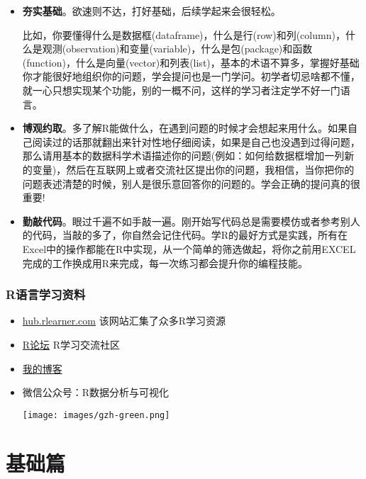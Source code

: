 \documentclass[
  letterpaper,
  DIV=11,
  numbers=noendperiod]{scrreprt}
\begin{document}

\begin{itemize}
\item
  \textbf{夯实基础}。欲速则不达，打好基础，后续学起来会很轻松。

  比如，你要懂得什么是数据框(dataframe)，什么是行(row)和列(column)，什么是观测(observation)和变量(variable)，什么是包(package)和函数(function)，什么是向量(vector)和列表(list)，基本的术语不算多，掌握好基础你才能很好地组织你的问题，学会提问也是一门学问。初学者切忌啥都不懂，就一心只想实现某个功能，别的一概不问，这样的学习者注定学不好一门语言。
\item
  \textbf{博观约取}。多了解R能做什么，在遇到问题的时候才会想起来用什么。如果自己阅读过的话那就翻出来针对性地仔细阅读，如果是自己也没遇到过得问题，那么请用基本的数据科学术语描述你的问题(例如：如何给数据框增加一列新的变量)，然后在互联网上或者交流社区提出你的问题，我相信，当你把你的问题表述清楚的时候，别人是很乐意回答你的问题的。学会正确的提问真的很重要!
\item
  \textbf{勤敲代码}。眼过千遍不如手敲一遍。刚开始写代码总是需要模仿或者参考别人的代码，当敲的多了，你自然会记住代码。学R的最好方式是实践，所有在Excel中的操作都能在R中实现，从一个简单的筛选做起，将你之前用EXCEL完成的工作换成用R来完成，每一次练习都会提升你的编程技能。
\end{itemize}

\hypertarget{rux8bedux8a00ux5b66ux4e60ux8d44ux6599}{%
\section*{R语言学习资料}\label{rux8bedux8a00ux5b66ux4e60ux8d44ux6599}}


\begin{itemize}
\item
  \href{https://hub.rlearner.com}{hub.rlearner.com}
  该网站汇集了众多R学习资源
\item
  \href{https://rlearner.com}{R论坛} R学习交流社区
\item
  \href{https://blog.rlearner.com/r-index.html}{我的博客}
\item
  微信公众号：R数据分析与可视化

  \texttt{[image: images/gzh-green.png]}
\end{itemize}

\part{基础篇}
\end{document}
